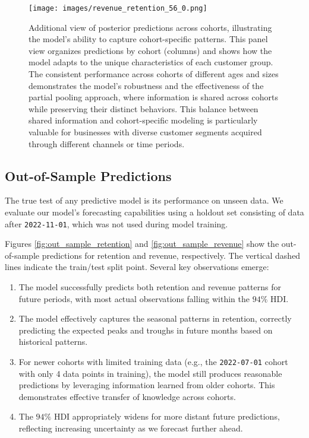 \documentclass[11pt]{amsart}
\theoremstyle{definition}
\begin{document}
\begin{figure}
    \texttt{[image: images/revenue\_retention\_56\_0.png]}
    \caption{Additional view of posterior predictions across cohorts, illustrating the model's ability to capture
        cohort-specific patterns. This panel view organizes predictions by cohort (columns) and shows how the model
        adapts to the unique characteristics of each customer group. The consistent performance across cohorts of
        different ages and sizes demonstrates the model's robustness and the effectiveness of the partial pooling
        approach, where information is shared across cohorts while preserving their distinct behaviors. This balance
        between shared information and cohort-specific modeling is particularly valuable for businesses with diverse
        customer segments acquired through different channels or time periods.}
    \label{fig:additional_predictions}
\end{figure}

\subsection{Out-of-Sample Predictions}

The true test of any predictive model is its performance on unseen data. We evaluate our model's forecasting capabilities
using a holdout set consisting of data after \texttt{2022-11-01}, which was not used during model training.

Figures \ref{fig:out_sample_retention} and \ref{fig:out_sample_revenue} show the out-of-sample predictions for retention and
revenue, respectively. The vertical dashed lines indicate the train/test split point. Several key observations emerge:

\begin{enumerate}
    \item The model successfully predicts both retention and revenue patterns for future periods, with most actual
          observations falling within the $94\%$ HDI.

    \item The model effectively captures the seasonal patterns in retention, correctly predicting the expected peaks and
          troughs in future months based on historical patterns.

    \item For newer cohorts with limited training data (e.g., the \texttt{2022-07-01} cohort with only 4 data points in
          training), the model still produces reasonable predictions by leveraging information learned from older cohorts.
          This demonstrates effective transfer of knowledge across cohorts.

    \item The $94\%$ HDI appropriately widens for more distant future predictions, reflecting increasing uncertainty as we
          forecast further ahead.
\end{enumerate}
\end{document}
